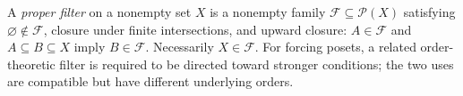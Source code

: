 
A \emph{proper filter} on a nonempty set $X$ is a nonempty family $\mathcal F\subseteq\mathcal P(X)$ satisfying $\varnothing\notin\mathcal F$, closure under finite intersections, and upward closure: $A\in\mathcal F$ and $A\subseteq B\subseteq X$ imply $B\in\mathcal F$. Necessarily $X\in\mathcal F$. For forcing posets, a related order-theoretic filter is required to be directed toward stronger conditions; the two uses are compatible but have different underlying orders.
